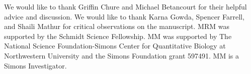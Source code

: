 \documentclass[
  letterpaper,
  DIV=11,
  numbers=noendperiod]{scrartcl}
\begin{document}
\begin{refsegment}
We would like to thank Griffin Chure and Michael Betancourt for their helpful
advice and discussion. We would like to thank Karna Gowda, Spencer Farrell, and
Shaili Mathur for critical observations on the manuscript. MRM was supported by
the Schmidt Science Fellowship. MM was supported by The National Science
Foundation-Simons Center for Quantitative Biology at Northwestern University and
the Simons Foundation grant 597491. MM is a Simons Investigator.

\printbibliography[segment=\therefsegment]
\end{refsegment}

\clearpage


\end{document}

